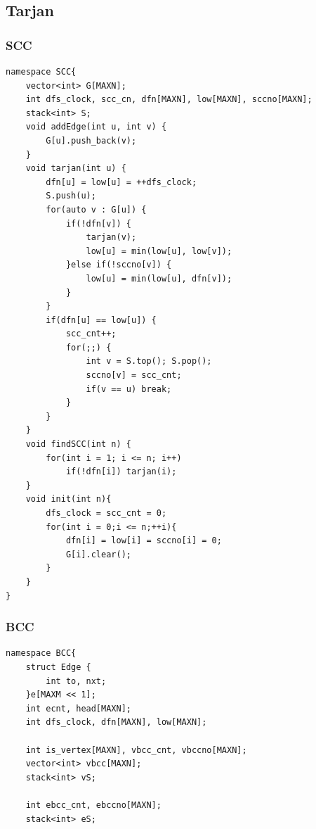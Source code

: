 \documentclass[10pt]{ctexart}
\begin{document}
{\subsection{Tarjan}
\subsubsection{SCC}
\begin{lstlisting}
namespace SCC{
    vector<int> G[MAXN];
    int dfs_clock, scc_cn, dfn[MAXN], low[MAXN], sccno[MAXN];
    stack<int> S;
    void addEdge(int u, int v) {
        G[u].push_back(v);
    }
    void tarjan(int u) {
        dfn[u] = low[u] = ++dfs_clock;
        S.push(u);
        for(auto v : G[u]) {
            if(!dfn[v]) {
                tarjan(v);
                low[u] = min(low[u], low[v]);
            }else if(!sccno[v]) {
                low[u] = min(low[u], dfn[v]);
            }
        }
        if(dfn[u] == low[u]) {
            scc_cnt++;
            for(;;) {
                int v = S.top(); S.pop();
                sccno[v] = scc_cnt;
                if(v == u) break;
            }
        }
    }
    void findSCC(int n) {
        for(int i = 1; i <= n; i++)
            if(!dfn[i]) tarjan(i);
    }
    void init(int n){
        dfs_clock = scc_cnt = 0;
        for(int i = 0;i <= n;++i){
            dfn[i] = low[i] = sccno[i] = 0;
            G[i].clear();
        }
    }
}
\end{lstlisting}
\subsubsection{BCC}
\begin{lstlisting}
namespace BCC{
    struct Edge {
        int to, nxt;
    }e[MAXM << 1];
    int ecnt, head[MAXN];
    int dfs_clock, dfn[MAXN], low[MAXN];

    int is_vertex[MAXN], vbcc_cnt, vbccno[MAXN];              
    vector<int> vbcc[MAXN];                                   
    stack<int> vS;                                            

    int ebcc_cnt, ebccno[MAXN];                               
    stack<int> eS;                                            


\end{lstlisting}}
\end{document}
